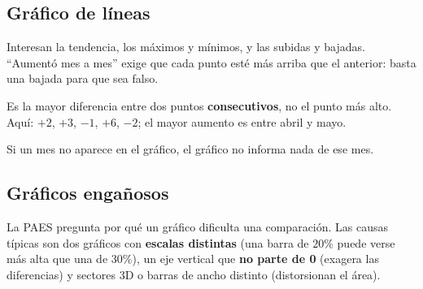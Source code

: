 \subsection{Gráfico de líneas}
Interesan la tendencia, los máximos y mínimos, y las subidas y bajadas. ``Aumentó mes a mes'' exige que cada punto esté más arriba que el anterior: basta una bajada para que sea falso.

\begin{minipage}[t]{0.5\linewidth}\vspace{0pt}
\begin{clave} Es la mayor diferencia entre dos puntos \textbf{consecutivos}, no el punto más alto. Aquí: $+2$, $+3$, $-1$, $+6$, $-2$; el mayor aumento es entre abril y mayo.\end{clave}
\begin{ojo} Si un mes no aparece en el gráfico, el gráfico no informa nada de ese mes.\end{ojo}
\end{minipage}\hfill
\begin{minipage}[t]{0.46\linewidth}\vspace{0pt}\centering
{}
\end{minipage}

\subsection{Gráficos engañosos}
La PAES pregunta por qué un gráfico dificulta una comparación. Las causas típicas son dos gráficos con \textbf{escalas distintas} (una barra de $20\%$ puede verse más alta que una de $30\%$), un eje vertical que \textbf{no parte de 0} (exagera las diferencias) y sectores 3D o barras de ancho distinto (distorsionan el área).


